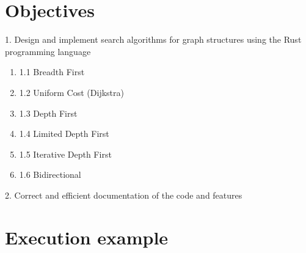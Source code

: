 \vfill

\newpage
{}
\tableofcontents

\newpage
\section{Objectives}

1. Design and implement search algorithms for graph structures using
the Rust programming language

\begin{enumerate}[label={}]
    \item 1.1 Breadth First
    \item 1.2 Uniform Cost (Dijkstra)
    \item 1.3 Depth First
    \item 1.4 Limited Depth First
    \item 1.5 Iterative Depth First
    \item 1.6 Bidirectional
\end{enumerate}



2. Correct and efficient documentation of the code and features


\section{Execution example}

